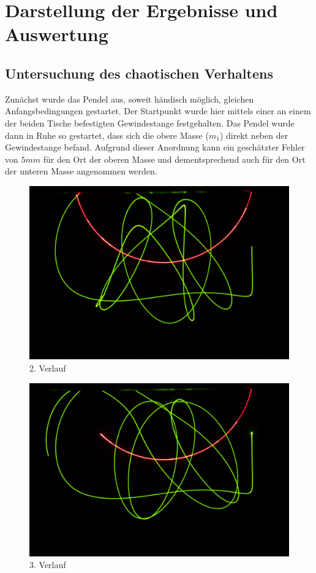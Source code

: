 \section{Darstellung der Ergebnisse und Auswertung}

\subsection{Untersuchung des chaotischen Verhaltens}
Zunächst wurde das Pendel aus, soweit händisch möglich, gleichen Anfangsbedingungen gestartet. Der Startpunkt wurde hier mittels einer an einem der beiden Tische befestigten Gewindestange festgehalten. Das Pendel wurde dann in Ruhe so gestartet, dass sich die obere Masse ($ m_{1} $) direkt neben der Gewindestange befand. Aufgrund dieser Anordnung kann ein geschätzter Fehler von $ 5  mm $ für den Ort der oberen Masse und dementsprechend auch für den Ort der unteren Masse angenommen werden.

\begin{figure}
        \includegraphics[width=.9\textwidth]{images/pendel-10.jpg}
\caption{2. Verlauf}
\label{pendel-10}
\end{figure}

\begin{figure}
        \includegraphics[width=.9\textwidth]{images/pendel-9}
\caption{3. Verlauf}
\label{pendel-9}
\end{figure}

